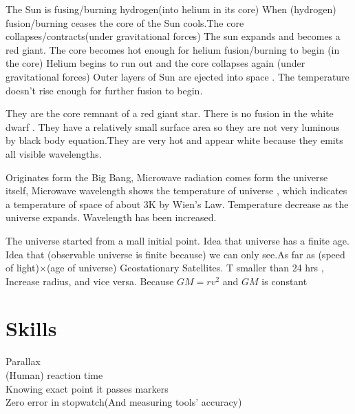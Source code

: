 \documentclass[a4paper]{article}
\begin{document}
\begin{defi}
The Sun is fusing/burning hydrogen(into helium in its core) When (hydrogen) fusion/burning ceases the core of the Sun cools.The core collapses/contracts(under gravitational forces) The sun expands and becomes a red giant. The core becomes hot enough for helium fusion/burning to begin (in the core) Helium begins to run out and the core collapses again (under gravitational forces) Outer layers of Sun are ejected into space . The temperature doesn't rise enough for further fusion to begin.
\end{defi}

\begin{defi}
They are the core remnant of a red giant star. There is no fusion in the white dwarf . They have a relatively small surface area so they are not very luminous by black body equation.They are very hot and appear white because they emits all visible wavelengths.
\end{defi}

\begin{defi}
Originates form the Big Bang, Microwave radiation comes form the universe itself, Microwave wavelength shows the temperature of universe , which indicates a temperature of space of about 3K by Wien's Law. Temperature decrease as the universe expands. Wavelength has been increased.
\end{defi}

\begin{defi}
The universe started from a mall initial point. Idea that universe has a finite age. Idea that (observable universe is finite because)
we can only see.As far as (speed of light)$\times$(age of universe)
Geostationary Satellites. T smaller than 24 hrs , Increase radius, and vice versa. Because $GM=rv^2$ and $GM$ is constant
\end{defi}

\section{Skills}
\begin{prop}[Unit]

\end{prop}
\begin{prop}
Parallax\\
(Human) reaction time\\
Knowing exact point it passes markers\\
Zero error in stopwatch(And measuring tools' accuracy)
\end{prop}


\begin{defi}
\end{defi}
\end{document}
